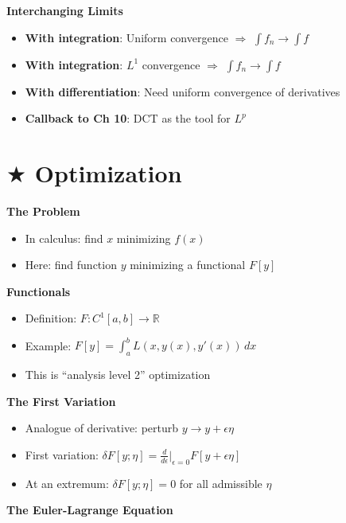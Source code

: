 \documentclass[
  10pt,
  letterpaper,
]{scrbook}
\providecommand{\tightlist}{%
  \setlength{\itemsep}{0pt}\setlength{\parskip}{0pt}}
\begin{document}
\textbf{Interchanging Limits}

\begin{itemize}
\tightlist
\item
  \textbf{With integration}: Uniform convergence \(\Rightarrow\)
  \(\int f_n \to \int f\)
\item
  \textbf{With integration}: \(L^1\) convergence \(\Rightarrow\)
  \(\int f_n \to \int f\)
\item
  \textbf{With differentiation}: Need uniform convergence of derivatives
\item
  \textbf{Callback to Ch 10}: DCT as the tool for \(L^p\)
\end{itemize}

\section{\texorpdfstring{\(\bigstar\)
Optimization}{\textbackslash bigstar Optimization}}\label{bigstar-optimization}

\textbf{The Problem}

\begin{itemize}
\tightlist
\item
  In calculus: find \(x\) minimizing \(f(x)\)
\item
  Here: find function \(y\) minimizing a functional \(F[y]\)
\end{itemize}

\textbf{Functionals}

\begin{itemize}
\tightlist
\item
  Definition: \(F: C^1[a,b] \to \mathbb{R}\)
\item
  Example: \(F[y] = \int_a^b L(x, y(x), y'(x))\, dx\)
\item
  This is ``analysis level 2'' optimization
\end{itemize}

\textbf{The First Variation}

\begin{itemize}
\tightlist
\item
  Analogue of derivative: perturb \(y \to y + \epsilon \eta\)
\item
  First variation:
  \(\delta F[y; \eta] = \frac{d}{d\epsilon}\Big|_{\epsilon=0} F[y + \epsilon\eta]\)
\item
  At an extremum: \(\delta F[y; \eta] = 0\) for all admissible \(\eta\)
\end{itemize}

\textbf{The Euler-Lagrange Equation}
\end{document}
